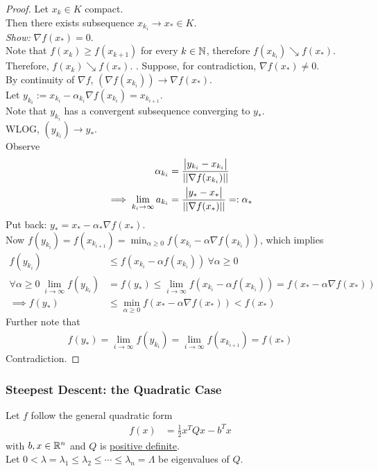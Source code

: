 \documentclass{article}
\begin{document}
	\begin{proof}
		Let $x_k \in K$ compact. \\
		Then there exists subsequence $x_{k_i} \to x_* \in K$. \\
		\emph{Show:} $\nabla f(x_*) = 0$. \\
		Note that $f(x_k) \geq f(x_{k+1})$ for every $k \in \mathbb{N}$, therefore $f(x_{k_i}) \searrow f(x_*)$. Therefore, $f(x_{k}) \searrow f(x_*)$.
		.
		Suppose, for contradiction, $\nabla f(x_*) \neq 0$. \\
		By continuity of $\nabla f$, $(\nabla f(x_{k_i})) \to \nabla f(x_*)$. \\
		Let $y_{k_i} := x_{k_i} - \alpha_{k_i} \nabla f(x_{k_i}) = x_{k_{i+1}}$. \\
		Note that $y_{k_i}$ has a convergent subsequence converging to $y_*$. \\
		WLOG, $(y_{k_i}) \to y_*$. \\
		Observe
		\begin{align}
			\alpha_{k_i} &= \frac{\big \vert {y_{k_i} - x_{k_i}} \big \vert}{\vert \vert {\nabla f(x_{k_i})} \vert \vert} \\
			\implies \lim_{k_i \to \infty} a_{k_i} &= \frac{\big \vert {y_* - x_*} \big \vert}{\vert \vert {\nabla f(x_*)} \vert \vert} =: \alpha_*
		\end{align}
		Put back: $y_* = x_* - \alpha_* \nabla f(x_*)$. \\
		Now $f(y_{k_i}) = f(x_{k_{i+1}}) = \min_{\alpha \geq 0} f(x_{k_i} - \alpha \nabla f(x_{k_i}))$, which implies
		\begin{align}
			f(y_{k_i}) &\leq f(x_{k_i} - \alpha f(x_{k_i}))\ \forall \alpha \geq 0 \\
			\forall \alpha \geq 0\ \lim_{i \to \infty} f(y_{k_i}) &= f(y_*) \leq \lim_{i \to \infty} f(x_{k_i} - \alpha f(x_{k_i})) = f(x_* - \alpha \nabla f(x_*)) \\
			\implies f(y_*) &\leq \min_{\alpha \geq 0} f(x_* - \alpha \nabla f(x_*)) < f(x_*)
		\end{align}
		Further note that 
		\begin{align}
			f(y_*) = \lim_{i \to \infty} f(y_{k_i}) = \lim_{i \to \infty} f(x_{k_{i+1}}) = f(x_*)
		\end{align}
		Contradiction.
	\end{proof}
	
	\subsubsection{Steepest Descent: the Quadratic Case}
	\begin{example}
		Let $f$ follow the general quadratic form
		\begin{align}
			f(x) &= \frac{1}{2} x^T Q x - b^T x
		\end{align}
		with $b, x \in \mathbb{R}^n$ and $Q$ is \ul{positive definite}. \\
		Let $0 < \lambda = \lambda_1 \leq \lambda_2 \leq \cdots \leq \lambda_n = \Lambda$ be eigenvalues of $Q$.
	\end{example}
	
\end{document}

